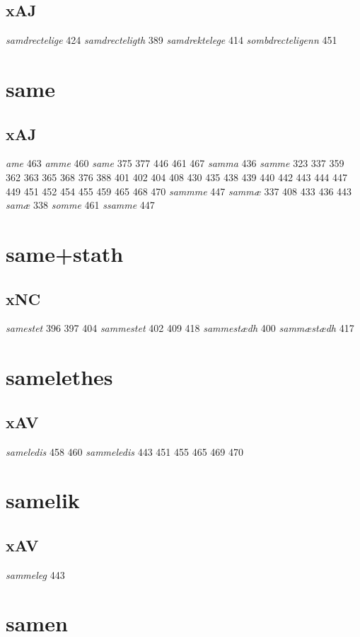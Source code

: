 \documentclass[a4paper,twocolumn]{article}
\begin{document}
\subsection{xAJ}
\label{sec:org0ca72c1}
\emph{samdrectelige} 424 \emph{samdrecteligth} 389 \emph{samdrektelege} 414 \emph{sombdrecteligenn} 451 
\section{same}
\label{sec:orged554cd}
\subsection{xAJ}
\label{sec:org2306d25}
\emph{ame} 463 \emph{amme} 460 \emph{same} 375 377 446 461 467 \emph{samma} 436 \emph{samme} 323 337 359 362 363 365 368 376 388 401 402 404 408 430 435 438 439 440 442 443 444 447 449 451 452 454 455 459 465 468 470 \emph{sammme} 447 \emph{sammæ} 337 408 433 436 443 \emph{samæ} 338 \emph{somme} 461 \emph{ssamme} 447 
\section{same+stath}
\label{sec:org912791f}
\subsection{xNC}
\label{sec:org26fc76f}
\emph{samestet} 396 397 404 \emph{sammestet} 402 409 418 \emph{sammestædh} 400 \emph{sammæstædh} 417 
\section{samelethes}
\label{sec:org5beeb5d}
\subsection{xAV}
\label{sec:org29b3314}
\emph{sameledis} 458 460 \emph{sammeledis} 443 451 455 465 469 470 
\section{samelik}
\label{sec:orga643a44}
\subsection{xAV}
\label{sec:org375b83a}
\emph{sammeleg} 443 
\section{samen}
\label{sec:org5fe8564}
\end{document}
